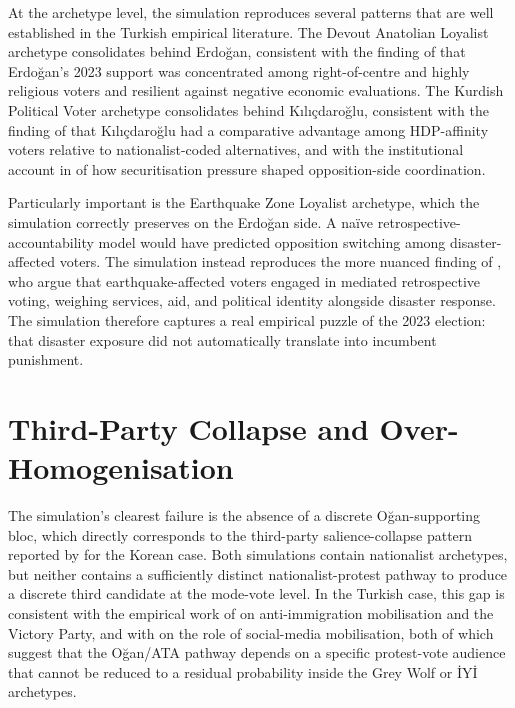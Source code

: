 \documentclass[12pt,a4paper]{report}
\begin{document}
At the archetype level, the simulation reproduces several patterns that are well established in the Turkish empirical literature. The Devout Anatolian Loyalist archetype consolidates behind Erdoğan, consistent with the finding of \citet{carkoglu2024unlikely} that Erdoğan's 2023 support was concentrated among right-of-centre and highly religious voters and resilient against negative economic evaluations. The Kurdish Political Voter archetype consolidates behind Kılıçdaroğlu, consistent with the finding of \citet{baruh2024difficult} that Kılıçdaroğlu had a comparative advantage among HDP-affinity voters relative to nationalist-coded alternatives, and with the institutional account in \citet{ilbiz2023securitization} of how securitisation pressure shaped opposition-side coordination.

Particularly important is the Earthquake Zone Loyalist archetype, which the simulation correctly preserves on the Erdoğan side. A naïve retrospective-accountability model would have predicted opposition switching among disaster-affected voters. The simulation instead reproduces the more nuanced finding of \citet{sevinc2024afet}, who argue that earthquake-affected voters engaged in mediated retrospective voting, weighing services, aid, and political identity alongside disaster response. The simulation therefore captures a real empirical puzzle of the 2023 election: that disaster exposure did not automatically translate into incumbent punishment.

\section{Third-Party Collapse and Over-Homogenisation}
\label{sec:disc_thirdparty}

The simulation's clearest failure is the absence of a discrete Oğan-supporting bloc, which directly corresponds to the third-party salience-collapse pattern reported by \citet{kang2026dynamok} for the Korean case. Both simulations contain nationalist archetypes, but neither contains a sufficiently distinct nationalist-protest pathway to produce a discrete third candidate at the mode-vote level. In the Turkish case, this gap is consistent with the empirical work of \citet{gerim2025victory} on anti-immigration mobilisation and the Victory Party, and with \citet{karaca2024socialmedia} on the role of social-media mobilisation, both of which suggest that the Oğan/ATA pathway depends on a specific protest-vote audience that cannot be reduced to a residual probability inside the Grey Wolf or İYİ archetypes.
\end{document}
